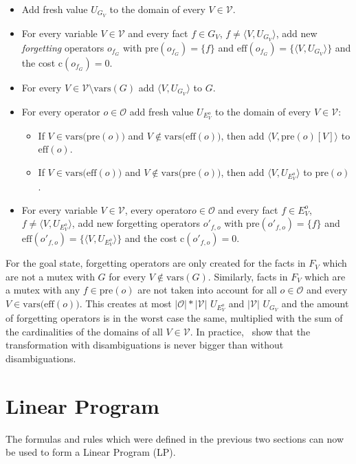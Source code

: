 \begin{itemize}
    \item Add fresh value $U_{G_V}$ to the domain of every $V\in\mathcal{V}$.
    \item For every variable $V\in\mathcal{V}$ and every fact $f\in G_V$, $f\neq\langle V,U_{G_V}\rangle$, add new \textit{forgetting} operators $o_{f_G}$ with $\text{pre}(o_{f_G})=\{f\}$ and $\text{eff}(o_{f_G})=\{\langle V,U_{G_V}\rangle\}$ and the cost $\text{c}(o_{f_G})=0$.
    \item For every $V\in\mathcal{V}\setminus\text{vars}(G)$ add $\langle V,U_{G_V}\rangle$ to $G$.
    \item For every operator $o\in\mathcal{O}$ add fresh value $U_{E^o_V}$ to the domain of every $V\in\mathcal{V}$:
    \begin{itemize}
        \item If $V\in\text{vars(pre}(o))$ and $V\notin\text{vars(eff}(o))$, then add $\langle V,\text{pre}(o)[V]\rangle$ to $\text{eff}(o)$.
        \item If $V\in\text{vars(eff}(o))$ and $V\notin\text{vars(pre}(o))$, then add $\langle V,U_{E^o_V}\rangle$ to $\text{pre}(o)$.
    \end{itemize}
    \item For every variable $V\in\mathcal{V}$, every operator$o\in\mathcal{O}$ and every fact $f\in E_V^o$, $f\neq\langle V,U_{E^o_V}\rangle$, add new forgetting operators $o'_{f,o}$ with $\text{pre}(o'_{f,o})=\{f\}$ and $\text{eff}(o'_{f,o})=\{\langle V,U_{E^o_V}\rangle\}$ and the cost $\text{c}(o'_{f,o})=0$.
\end{itemize}

For the goal state, forgetting operators are only created for the facts in $F_V$ which are not a mutex with $G$ for every $V\notin\text{vars}(G)$.
Similarly, facts in $F_V$ which are a mutex with any $f\in\text{pre}(o)$ are not taken into account for all $o\in\mathcal{O}$ and every $V\in\text{vars(eff}(o))$.
This creates at most $|\mathcal{O}|*|\mathcal{V}|$ $U_{E_V^o}$ and $|\mathcal{V}|$ $U_{G_V}$ and the amount of forgetting operators is in the worst case the same, multiplied with the sum of the cardinalities of the domains of all $V\in\mathcal{V}$.
In practice,~\cite{fivser2020strengthening} show that the transformation with disambiguations is never bigger than without disambiguations.

\section{Linear Program}\label{sec:linear-programm}
The formulas and rules which were defined in the previous two sections can now be used to form a Linear Program (LP).

